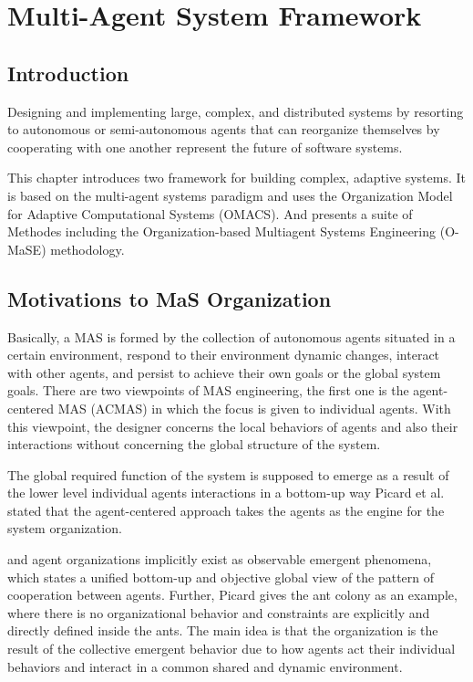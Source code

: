 
\chapter{\label{cha:org}Multi-Agent System Framework}


\section{Introduction}
Designing and implementing large, complex, and distributed systems by resorting to autonomous 
or semi-autonomous agents that can reorganize themselves by  cooperating with one another 
represent the future of software systems\cite{omacs0}. 

This chapter introduces two framework for building complex, adaptive systems. 
It is based on the multi-agent systems paradigm and uses the Organization Model for Adaptive 
Computational Systems (OMACS). 
And presents a suite of Methodes including the Organization-based Multiagent Systems Engineering 
(O-MaSE) methodology\cite{omacs4}.


\section{Motivations to MaS Organization}
 
Basically, a MAS is formed by the collection of autonomous agents situated in a certain environment, respond
to their environment dynamic changes, interact with other agents, and persist to achieve their own goals or the global
system goals. There are two viewpoints of MAS engineering, the first one is the agent-centered MAS (ACMAS) in which
the focus is given to individual agents. With this viewpoint, the designer concerns the local behaviors of agents and also
their interactions without concerning the global structure of the system\cite{omacs3}.

The global required function of the system is supposed to emerge as a result of the lower level individual
agents interactions in a bottom-up way Picard et al.  stated that the agent-centered approach takes the agents as the engine  for the system organization\cite{omacs3}.

and agent organizations implicitly exist as observable emergent phenomena, which states a unified bottom-up and
objective global view of the pattern of cooperation between agents. Further, Picard gives the ant colony as an example, where there is no organizational behavior and constraints are explicitly and directly defined inside the ants. The main idea is that the organization is the result of the collective emergent
behavior due to how agents act their individual behaviors and interact in a common shared and dynamic environment\cite{omacs3}.

